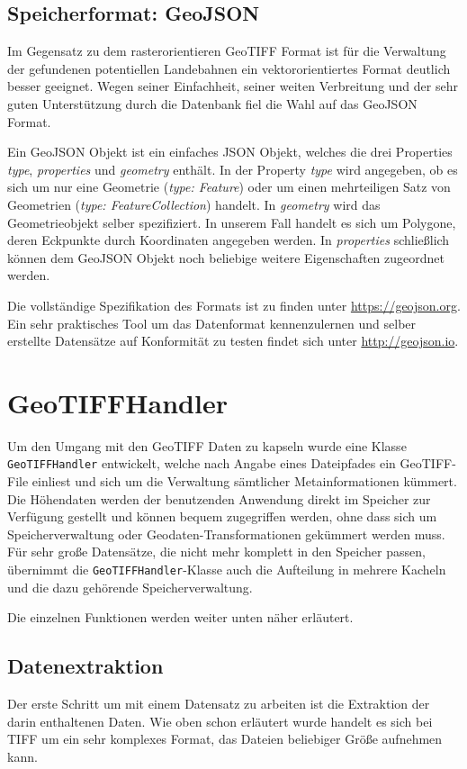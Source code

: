 \documentclass[10pt,a4paper]{report}
\begin{document}
\subsection{Speicherformat: GeoJSON}
Im Gegensatz zu dem rasterorientieren GeoTIFF Format ist für die Verwaltung der gefundenen potentiellen Landebahnen ein vektororientiertes Format deutlich besser geeignet. Wegen seiner Einfachheit, seiner weiten Verbreitung und der sehr guten Unterstützung durch die Datenbank fiel die Wahl auf das GeoJSON Format.

Ein GeoJSON Objekt ist ein einfaches JSON Objekt, welches die drei Properties \emph{type}, \emph{properties} und \emph{geometry} enthält. In der Property \emph{type} wird angegeben, ob es sich um nur eine Geometrie (\emph{type: Feature}) oder um einen mehrteiligen Satz von Geometrien (\emph{type: FeatureCollection}) handelt. In \emph{geometry} wird das Geometrieobjekt selber spezifiziert. In unserem Fall handelt es sich um Polygone, deren Eckpunkte durch Koordinaten angegeben werden. In \emph{properties} schließlich können dem GeoJSON Objekt noch beliebige weitere Eigenschaften zugeordnet werden.

Die vollständige Spezifikation des Formats ist zu finden unter \url{https://geojson.org}. Ein sehr praktisches Tool um das Datenformat kennenzulernen und selber erstellte Datensätze auf Konformität zu testen findet sich unter \url{http://geojson.io}.

\section{GeoTIFFHandler}

Um den Umgang mit den GeoTIFF Daten zu kapseln wurde eine Klasse \texttt{GeoTIFFHandler} entwickelt, welche nach Angabe eines Dateipfades ein GeoTIFF-File einliest und sich um die Verwaltung sämtlicher Metainformationen kümmert. Die Höhendaten werden der benutzenden Anwendung direkt im Speicher zur Verfügung gestellt und können bequem zugegriffen werden, ohne dass sich um Speicherverwaltung oder Geodaten-Transformationen gekümmert werden muss. Für sehr große Datensätze, die nicht mehr komplett in den Speicher passen, übernimmt die \texttt{GeoTIFFHandler}-Klasse auch die Aufteilung in mehrere Kacheln und die dazu gehörende Speicherverwaltung.

Die einzelnen Funktionen werden weiter unten näher erläutert.

\subsection{Datenextraktion}
Der erste Schritt um mit einem Datensatz zu arbeiten ist die Extraktion der darin enthaltenen Daten. Wie oben schon erläutert wurde handelt es sich bei TIFF um ein sehr komplexes Format, das Dateien beliebiger Größe aufnehmen kann.
\end{document}
